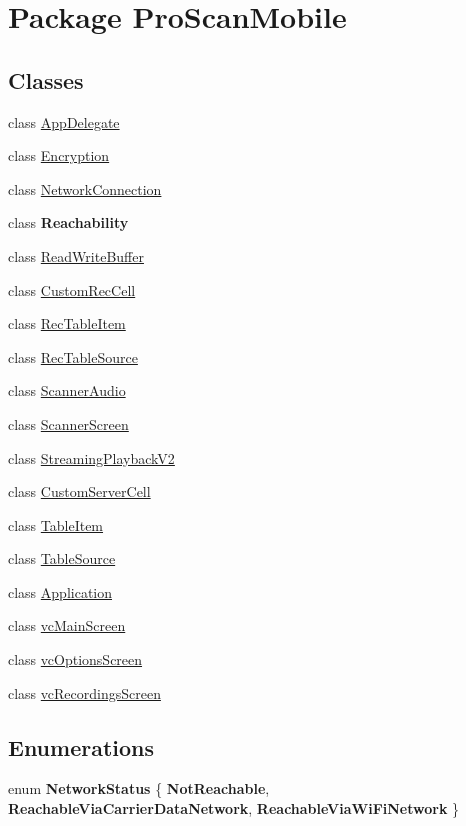\hypertarget{namespace_pro_scan_mobile}{\section{Package Pro\-Scan\-Mobile}
\label{namespace_pro_scan_mobile}
}
\subsection*{Classes}
\begin{DoxyCompactItemize}
\item 
class \hyperlink{class_pro_scan_mobile_1_1_app_delegate}{App\-Delegate}
\item 
class \hyperlink{class_pro_scan_mobile_1_1_encryption}{Encryption}
\item 
class \hyperlink{class_pro_scan_mobile_1_1_network_connection}{Network\-Connection}
\item 
class {\bfseries Reachability}
\item 
class \hyperlink{class_pro_scan_mobile_1_1_read_write_buffer}{Read\-Write\-Buffer}
\item 
class \hyperlink{class_pro_scan_mobile_1_1_custom_rec_cell}{Custom\-Rec\-Cell}
\item 
class \hyperlink{class_pro_scan_mobile_1_1_rec_table_item}{Rec\-Table\-Item}
\item 
class \hyperlink{class_pro_scan_mobile_1_1_rec_table_source}{Rec\-Table\-Source}
\item 
class \hyperlink{class_pro_scan_mobile_1_1_scanner_audio}{Scanner\-Audio}
\item 
class \hyperlink{class_pro_scan_mobile_1_1_scanner_screen}{Scanner\-Screen}
\item 
class \hyperlink{class_pro_scan_mobile_1_1_streaming_playback_v2}{Streaming\-Playback\-V2}
\item 
class \hyperlink{class_pro_scan_mobile_1_1_custom_server_cell}{Custom\-Server\-Cell}
\item 
class \hyperlink{class_pro_scan_mobile_1_1_table_item}{Table\-Item}
\item 
class \hyperlink{class_pro_scan_mobile_1_1_table_source}{Table\-Source}
\item 
class \hyperlink{class_pro_scan_mobile_1_1_application}{Application}
\item 
class \hyperlink{class_pro_scan_mobile_1_1vc_main_screen}{vc\-Main\-Screen}
\item 
class \hyperlink{class_pro_scan_mobile_1_1vc_options_screen}{vc\-Options\-Screen}
\item 
class \hyperlink{class_pro_scan_mobile_1_1vc_recordings_screen}{vc\-Recordings\-Screen}
\end{DoxyCompactItemize}
\subsection*{Enumerations}
\begin{DoxyCompactItemize}
\item 
enum {\bfseries Network\-Status} \{ {\bfseries Not\-Reachable}, 
{\bfseries Reachable\-Via\-Carrier\-Data\-Network}, 
{\bfseries Reachable\-Via\-Wi\-Fi\-Network}
 \}
\end{DoxyCompactItemize}
